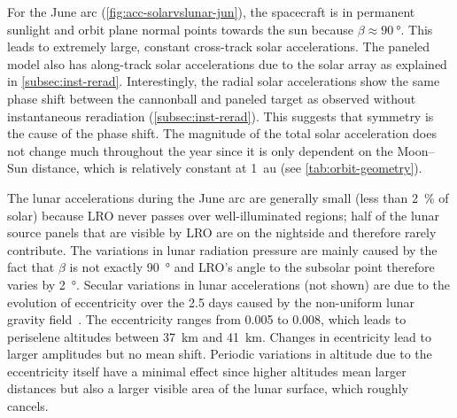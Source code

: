 For the June arc (\cref{fig:acc-solarvslunar-jun}), the spacecraft is in permanent sunlight and orbit plane normal points towards the sun because $\beta \approx \qty{90}{\degree}$. This leads to extremely large, constant cross-track solar accelerations. The paneled model also has along-track solar accelerations due to the solar array as explained in \cref{subsec:inst-rerad}. Interestingly, the radial solar accelerations show the same phase shift between the cannonball and paneled target as observed without instantaneous reradiation (\cref{subsec:inst-rerad}). This suggests that symmetry is the cause of the phase shift. The magnitude of the total solar acceleration does not change much throughout the year since it is only dependent on the Moon--Sun distance, which is relatively constant at \qty{1}{\astronomicalunit} (see \cref{tab:orbit-geometry}).

The lunar accelerations during the June arc are generally small (less than \qty{2}{\percent} of solar) because \gls{LRO} never passes over well-illuminated regions; half of the lunar source panels that are visible by \gls{LRO} are on the nightside and therefore rarely contribute. The variations in lunar radiation pressure are mainly caused by the fact that $\beta$ is not exactly \qty{90}{\degree} and \gls{LRO}'s angle to the subsolar point therefore varies by \qty{2}{\degree}. Secular variations in lunar accelerations (not shown) are due to the evolution of eccentricity over the 2.5 days caused by the non-uniform lunar gravity field~\cite{Tooley2010}. The eccentricity ranges from 0.005 to 0.008, which leads to periselene altitudes between \qty{37}{\km} and \qty{41}{\km}. Changes in ecentricity lead to larger amplitudes but no mean shift. Periodic variations in altitude due to the eccentricity itself have a minimal effect since higher altitudes mean larger distances but also a larger visible area of the lunar surface, which roughly cancels.

